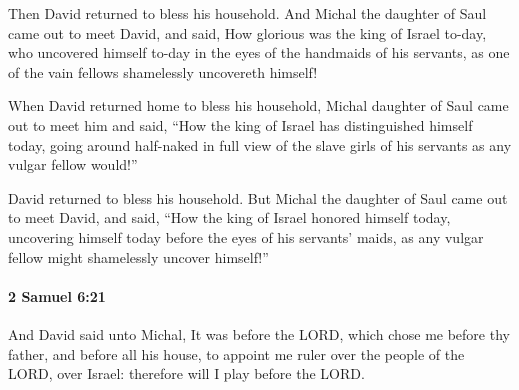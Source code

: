 			\begin{versebox}
					\item[BHS] 
					\item[ASV] Then David returned to bless his household. And Michal the daughter of Saul came out to meet David, and said, How glorious was the king of Israel to-day, who uncovered himself to-day in the eyes of the handmaids of his servants, as one of the vain fellows shamelessly uncovereth himself!
					\item[NIV] When David returned home to bless his household, Michal daughter of Saul came out to meet him and said, “How the king of Israel has distinguished himself today, going around half-naked in full view of the slave girls of his servants as any vulgar fellow would!”
					\item[NRSV] David returned to bless his household. But Michal the daughter of Saul came out to meet David, and said, “How the king of Israel honored himself today, uncovering himself today before the eyes of his servants’ maids, as any vulgar fellow might shamelessly uncover himself!”
			\end{versebox}

		\paragraph{2 Samuel 6:21} %
			\label{2SAMUEL-6-21}

			And David said unto Michal, It was before the LORD, which chose me before thy father, and before all his house, to appoint me ruler over the people of the LORD, over Israel: therefore will I play before the LORD.

